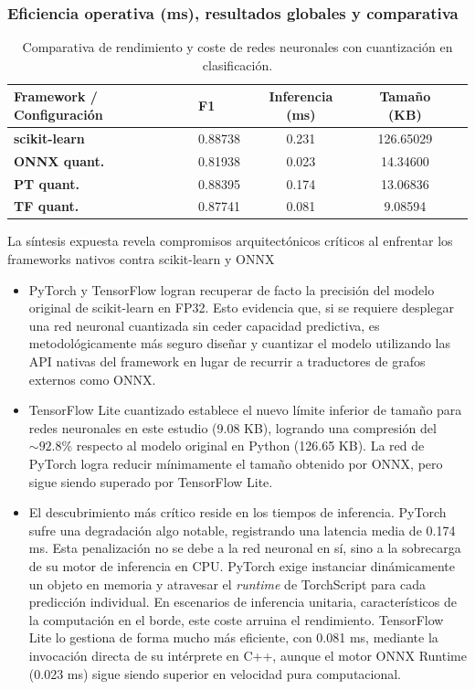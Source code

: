 \documentclass[a4paper,12pt,twoside,final]{book}
\begin{document}
\subsubsection{Eficiencia operativa (ms), resultados globales y comparativa}
\begin{table}[htbp]
  \centering
  \begin{tabularx}{\textwidth}{lXccc}
    \hline
    \textbf{Framework / Configuración} & \textbf{F1} & \textbf{Inferencia (ms)} & \textbf{Tamaño (KB)} \\
    \hline
    \textbf{scikit-learn}     & 0.88738 & 0.231 & 126.65029 \\
    \hline
    \textbf{ONNX quant.}      & 0.81938 & 0.023 & 14.34600  \\
    \hline
    \textbf{PT quant.}        & 0.88395 & 0.174 & 13.06836  \\
    \hline
    \textbf{TF quant.}        & 0.87741 & 0.081 & 9.08594   \\
    \hline
  \end{tabularx}
  \caption{Comparativa de rendimiento y coste de redes neuronales con cuantización en clasificación.}
  \label{tab:nn_quant_clas_resumen}
\end{table}
La síntesis expuesta revela compromisos arquitectónicos críticos al enfrentar los frameworks nativos contra scikit-learn y
ONNX
\begin{itemize}
  \item PyTorch y TensorFlow logran recuperar de facto la precisión del modelo original de scikit-learn en FP32. Esto
  evidencia que, si se requiere desplegar una red neuronal cuantizada sin ceder capacidad predictiva, es metodológicamente
  más seguro diseñar y cuantizar el modelo utilizando las API nativas del framework en lugar de recurrir a traductores de
  grafos externos como ONNX.
  \item TensorFlow Lite cuantizado establece el nuevo límite inferior de tamaño para redes neuronales en este estudio
  (9.08 KB), logrando una compresión del $\sim 92.8\%$ respecto al modelo original en Python (126.65 KB). La red de PyTorch
  logra reducir mínimamente el tamaño obtenido por ONNX, pero sigue siendo superado por TensorFlow Lite.
  \item El descubrimiento más crítico reside en los tiempos de inferencia. PyTorch sufre una degradación algo notable,
  registrando una latencia media de 0.174 ms. Esta penalización no se debe a la red neuronal en sí, sino a la sobrecarga
  de su motor de inferencia en CPU. PyTorch exige instanciar dinámicamente un objeto  en memoria y atravesar
  el \textit{runtime} de TorchScript para cada predicción individual. En escenarios de inferencia unitaria,
  característicos de la computación en el borde, este coste arruina el rendimiento. TensorFlow Lite lo gestiona de forma
  mucho más eficiente, con 0.081 ms, mediante la invocación directa de su intérprete en C++, aunque el motor ONNX Runtime
  (0.023 ms) sigue siendo superior en velocidad pura computacional.\\
\end{itemize}
\end{document}

